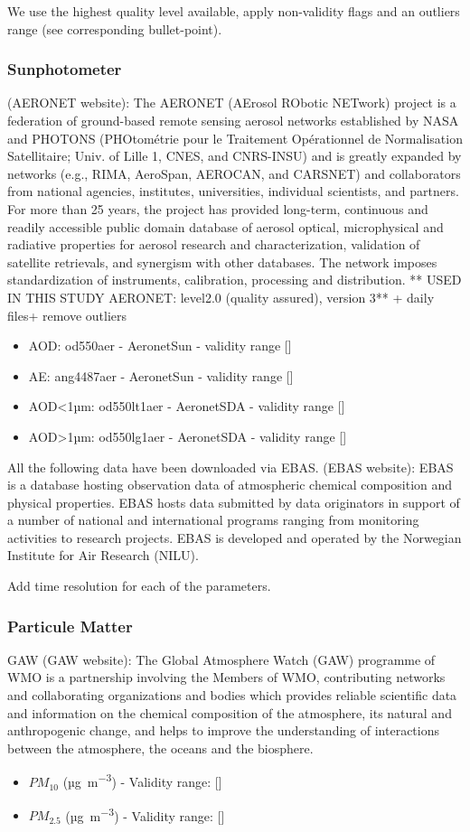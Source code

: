 \documentclass[journal abbreviation, manuscript]{copernicus}
\begin{document}
We use the highest quality level available, apply non-validity flags and an outliers range (see corresponding bullet-point).

\subsubsection{Sunphotometer}
(AERONET website): The AERONET (AErosol RObotic NETwork) project is a federation of ground-based remote sensing aerosol networks established by NASA and PHOTONS (PHOtométrie pour le Traitement Opérationnel de Normalisation Satellitaire; Univ. of Lille 1, CNES, and CNRS-INSU) and is greatly expanded by networks (e.g., RIMA, AeroSpan, AEROCAN, and CARSNET) and collaborators from national agencies, institutes, universities, individual scientists, and partners. For more than 25 years, the project has provided long-term, continuous and readily accessible public domain database of aerosol optical, microphysical and radiative properties for aerosol research and characterization, validation of satellite retrievals, and synergism with other databases. The network imposes standardization of instruments, calibration, processing and distribution.
** USED IN THIS STUDY AERONET: level2.0 (quality assured), version 3** + daily files+ remove outliers
\begin{itemize}
 \item AOD: od550aer - AeronetSun - validity range []
 \item AE: ang4487aer - AeronetSun - validity range []
 \item AOD<1µm: od550lt1aer - AeronetSDA - validity range []
 \item AOD>1µm: od550lg1aer - AeronetSDA - validity range []
\end{itemize}

All the following data have been downloaded via EBAS.
(EBAS website): EBAS is a database hosting observation data of atmospheric chemical composition and physical properties. EBAS hosts data submitted by data originators in support of a number of national and international programs ranging from monitoring activities to research projects. EBAS is developed and operated by the Norwegian Institute for Air Research (NILU).

Add time resolution for each of the parameters.

\subsubsection{Particule Matter}
GAW (GAW website): The Global Atmosphere Watch (GAW) programme of WMO is a partnership involving the Members of WMO, contributing networks and collaborating organizations and bodies which provides reliable scientific data and information on the chemical composition of the atmosphere, its natural and anthropogenic change, and helps to improve the understanding of interactions between the atmosphere, the oceans and the biosphere.
\begin{itemize}
 \item $PM_{10}$ (\unit{µg.m^{-3}}) - Validity range: []
 \item $PM_{2.5}$ (\unit{µg.m^{-3}}) - Validity range: []
\end{itemize}
\end{document}
